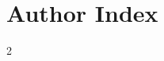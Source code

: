 \backmatter
\printindex

\newcommand{\ailetterheading}[1]{%
  \par{\bfseries\sffamily\fbox{ #1 }\hrulefill}\nopagebreak}
\renewenvironment{theauthorindex}{%
  \linespread{1}\selectfont%
  \setlength{\parskip}{0pt}%
  \raggedright%
  \setlength{\leftskip}{1em}%
  \setlength{\parindent}{-1em}%
  \def\item[##1]{\par\hspace{0mm}\ainame{##1}}%
  \aisize}{\par}
\chapter*{Author Index}
\begin{multicols}{2}
\printauthorindex
\end{multicols}
